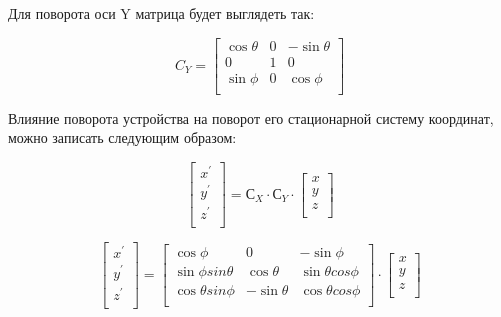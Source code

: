 Для поворота оси Y матрица будет выглядеть так:

\begin{equation}
    \label{eq:domain:rotatYmat}
    C_Y = \begin{bmatrix} \cos{\theta} & 0 & -\sin{\theta} \\ 
        0 & 1 & 0 \\ 
        \sin{\phi} & 0 & \cos{\phi} \\ 
    \end{bmatrix}
    \end{equation} 

Влияние поворота устройства на поворот его стационарной систему координат,
можно записать следующим образом:

\begin{equation}
    \label{eq:domain:magnetTilt}
    \begin{bmatrix} x^{'} \\ y^{'} \\ z^{'} \\ \end{bmatrix} = 
            С_X \cdot С_Y \cdot \begin{bmatrix} x \\ y \\ z \\ \end{bmatrix}
    \end{equation} 

\begin{equation}
    \label{eq:domain:magnetTiltExtendet}
    \begin{bmatrix} x^{'} \\ y^{'} \\ z^{'} \\ \end{bmatrix} = 
    \begin{bmatrix} \cos{\phi} & 0 & -\sin{\phi} \\ 
        \sin{\phi}sin{\theta} & \cos{\theta} & \sin{\theta}cos{\phi} \\ 
        \cos{\theta}sin{\phi} & -\sin{\theta} & \cos{\theta}cos{\phi} \\ 
    \end{bmatrix}
    \cdot
    \begin{bmatrix} x \\ y \\ z \\ \end{bmatrix}
    \end{equation} 

